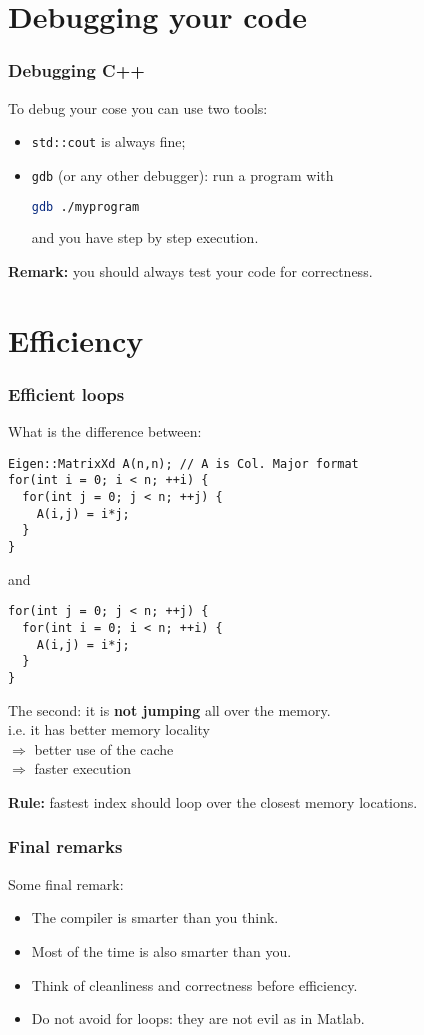 \documentclass{beamer}
\newcommand{\code}[1]{{\color{cgreen}\texttt{#1}}}
\begin{document}
\section{Debugging your code}

\begin{frame}[fragile]
\frametitle{Debugging C++}
 To debug your cose you can use two tools:
 \begin{itemize}
  \item \code{std::cout} is always fine;
  \item \code{gdb} (or any other debugger): run a program with
  \begin{lstlisting}[language=bash]
   gdb ./myprogram
  \end{lstlisting}
  and you have step by step execution.
 \end{itemize}
 \textbf{Remark:} you should always test your code for correctness.
\end{frame}


\section{Efficiency}

\begin{frame}
 \frametitle{Efficient loops}
 What is the difference between:
\begin{lstlisting}
Eigen::MatrixXd A(n,n); // A is Col. Major format
for(int i = 0; i < n; ++i) {
  for(int j = 0; j < n; ++j) {
    A(i,j) = i*j;
  }
}
\end{lstlisting}
and
\begin{lstlisting}
for(int j = 0; j < n; ++j) {
  for(int i = 0; i < n; ++i) {
    A(i,j) = i*j;
  }
}
\end{lstlisting}
\framebreak
The second: it is \textbf{not jumping} all over the memory. \\
i.e. it has better memory locality \\
$\Rightarrow$ better use of the cache \\
$\Rightarrow$ faster execution


\textbf{Rule:} fastest index should loop over the closest memory locations.
\end{frame}

\begin{frame}[fragile]
 \frametitle{Final remarks}
 Some final remark:
 \begin{itemize}
  \item The compiler is smarter than you think.
  \item Most of the time is also smarter than you.
  \item Think of cleanliness and correctness before efficiency.
  \item Do not avoid for loops: they are not evil as in Matlab.
 \end{itemize}
\end{frame}
\end{document}

